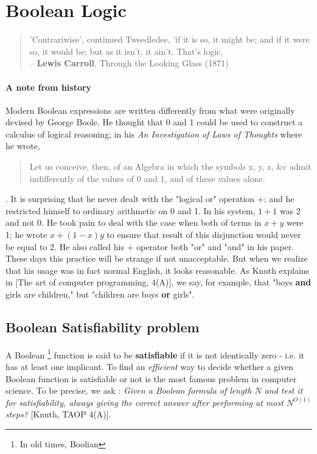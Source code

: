 \section{Boolean Logic}

\begin{quotation}
 \begin{flushright}
 'Contrariwise', continued Tweedledee, 'if it is so, 
 it might be; and if it were 
 so, it would be;  but as it isn't, it ain't. That's logic. \\
 -- \textbf{Lewis Carroll}, Through the Looking Glass (1871) 
 \end{flushright}
\end{quotation}
  
  \paragraph{A note from history} Modern Boolean expressions are written
  differently from what were originally devised by George Boole.  He thought
  that 0 and 1 could be used to construct a   calculus of logical reasoning; in
  his \textit{An Investigation of Laws of Thoughts} where he wrote,
  \begin{quote} Let us conceive, then, of an Algebra in which the symbols x, y,
    z, \&c admit indifferently of the values of 0 and 1, and of these values
    alone.  \end{quote}.  
  It is surprising that he never dealt with the "logical or" operation $+$; and
  he restricted himself to ordinary arithmetic on 0 and 1. In his system, $1+1$
  was 2 and not 0. He took pain to deal with the case when both of terms in
  $x+y$ were 1; he wrote $x+(1-x)y$ to ensure that result of this disjunction
  would never be equal to 2. He also called his $+$ operator both "or" and "and"
  in his paper. These days this practice will be strange if not unacceptable.
  But when we realize that his usage was in fact normal English, it looks
  reasonable. As Knuth explains in [The art of computer programming, 4(A)], we
  say, for example, that "boys \textbf{and} girls are children," but "children
  are boys \textbf{or} girls".
  
 \subsection{Boolean Satisfiability problem}

  A Boolean \footnote{In old times, Boolian} function is said to be
  \textbf{satisfiable} if it is not identically zero - i.e. it has at least one
  implicant. To find an \emph{efficient} way to decide whether a given Boolean
  function is satisfiable or not is the most famous problem in computer science.
  To be precise, we ask : \emph{Given a Boolean formula of length $N$ and test
  it for satisfiability, always giving the correct answer after performing at
  most $N^{O(1)}$ steps?} [Knuth, TAOP 4(A)].

